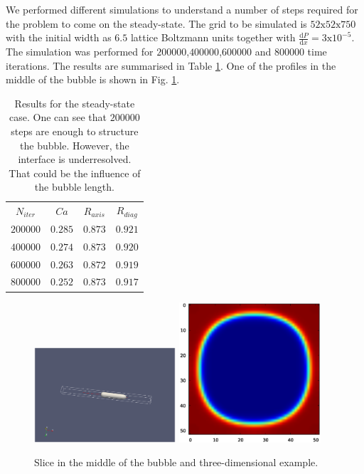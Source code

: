 \documentclass{article}
\begin{document}
We performed different simulations to understand a number of steps required for the problem to come
on the steady-state. The grid to be simulated is $52\mathrm{x}52\mathrm{x}750$ with the initial
width as $6.5$ lattice Boltzmann units together with $\frac{\mathrm{d}P}{\mathrm{d}x}=3
\mathrm{x}10^{-5}$. The simulation was performed for $200000$,$400000$,$600000$ and $800000$ time
iterations. The results are summarised in Table \ref{table:steady:state}. One of the profiles in
the middle of the bubble is shown in Fig. \ref{fig:steady:state:profile:example}.
\begin{table}
\begin{tabular}{|c|c|c|c|}
$N_{iter}$&$Ca$&$R_{axis}$&$R_{diag}$\\
$200000$&$0.285$&$0.873$&$0.921$\\
$400000$&$0.274$&$0.873$&$0.920$\\
$600000$&$0.263$&$0.872$&$0.919$\\
$800000$&$0.252$&$0.873$&$0.917$\\
\end{tabular}
\caption{Results for the steady-state case. One can see that $200000$ steps are enough to structure
the bubble. However, the interface is underresolved. That could be the influence of the bubble
length.\label{table:steady:state}}
\end{table}
\begin{figure}
\includegraphics[width=0.47\textwidth]{Figures/bullet.eps}\hfill
\includegraphics[width=0.47\textwidth]{Figures/example_crossection.eps}\\
\caption{Slice in the middle of the bubble and
three-dimensional example. \label{fig:steady:state:profile:example}}
\end{figure}
\end{document}
